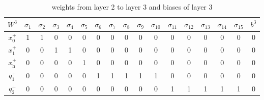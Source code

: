\documentclass{beamer}
\newcommand{\h}{_\text{h}}
\begin{document}
\begin{frame}
	\footnotesize
	\begin{table}[width=\textwidth]
		\centering
		{\setlength{\tabcolsep}{0.5em}
			\begin{tabular}{|c| c c c c c c c c c c c c c c c |c|}
				\hline 
				$W^3$ & $\sigma_1$ & $\sigma_2$ & $\sigma_3$ & $\sigma_4$ & $\sigma_5$ & $\sigma_6$ & $\sigma_7$ & $\sigma_8$ & $\sigma_9$ &  $\sigma_{10}$ & $\sigma_{11}$ & $\sigma_{12}$ & $\sigma_{13}$ & $\sigma_{14}$ & $\sigma_{15}$ & $b^3$\\
				\hline
				$x_0^+$ & 1 & 1 & 0 & 0 & 0 & 0 & 0 & 0 & 0 & 0 & 0 & 0 & 0 & 0 & 0 & 0\\
				$x_1^+$ & 0 & 0 & 1 & 1 & 0 & 0 & 0 & 0 & 0 & 0 & 0 & 0 & 0 & 0 & 0 & 0\\
				$x\h^+$ & 0 & 0 & 0 & 0 & 1 & 0 & 0 & 0 & 0 & 0 & 0 & 0 & 0 & 0 & 0 & 0\\
				$q_1^+$ & 0 & 0 & 0 & 0 & 0 & 1 & 1 & 1 & 1 & 1 & 0 & 0 & 0 & 0 & 0 & 0\\
				$q_2^+$ & 0 & 0 & 0 & 0 & 0 & 0 & 0 & 0 & 0 & 0 & 1 & 1 & 1 & 1 & 1 & 0\\
				\hline
			\end{tabular}
		}
		\caption{weights from layer 2 to layer 3 and biases of layer 3}
	\end{table}
\end{frame}
\end{document}
